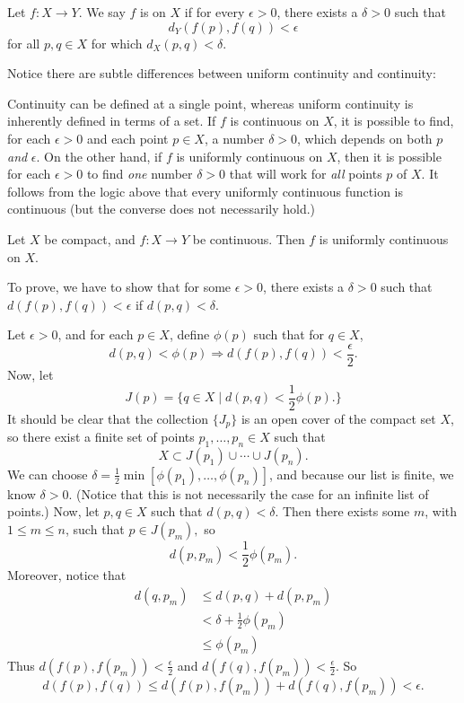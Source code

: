 \documentclass{article}
\begin{document}
\begin{definition}
    Let $f:X\rightarrow Y$. We say $f$ is  on $X$ if for every $\epsilon>0$, there exists a $\delta>0$ such that \[d_{Y}(f(p),f(q))<\epsilon\]for all $p,q\in X$ for which $d_{X}(p,q)<\delta$.
\end{definition}
Notice there are subtle differences between uniform continuity and continuity:
\begin{itemize}
    \ii Continuity can be defined at a single point, whereas uniform continuity is inherently defined in terms of a set.
    \ii If $f$ is continuous on $X$, it is possible to find, for each $\epsilon>0$ and each point $p\in X$, a number $\delta>0$, which depends on both $p$ \textit{and} $\epsilon$. 
    \ii On the other hand, if $f$ is uniformly continuous on $X$, then it is possible for each $\epsilon>0$ to find \textit{one} number $\delta>0$ that will work for \textit{all} points $p$ of $X$.
    \ii It follows from the logic above that every uniformly continuous function is continuous (but the converse does not necessarily hold.)
\end{itemize}
\begin{theorem}
    Let $X$ be compact, and $f:X\rightarrow Y$ be continuous. Then $f$ is uniformly continuous on $X$.
\end{theorem}
\begin{remark}
    To prove, we have to show that for some $\epsilon>0$, there exists a $\delta>0$ such that $d(f(p),f(q))<\epsilon$ if $d(p,q)<\delta$.

    Let $\epsilon>0$, and for each $p\in X$, define $\phi(p)$ such that for $q\in X$, 
    \[d(p,q)<\phi(p)\Rightarrow d(f(p),f(q))<\frac{\epsilon}{2}.\]Now, let \[J(p)=\{q\in X\mid d(p,q)<\frac{1}{2}\phi(p).\}\]
    It should be clear that the collection $\{J_{p}\}$ is an open cover of the compact set $X$, so there exist a finite set of points $p_{1},\dotsc,p_{n}\in X$ such that \[X\subset J(p_{1})\cup\dotsi\cup J(p_{n}).\]We can choose $\delta=\frac{1}{2}\min[\phi(p_{1}),\dotsc,\phi(p_{n})]$, and because our list is finite, we know $\delta>0$. (Notice that this is not necessarily the case for an infinite list of points.) Now, let $p,q\in X$ such that $d(p,q)<\delta$. Then there exists some $m$, with $1\leq m\leq n$, such that $p\in J(p_{m}),$ so \[d(p,p_{m})<\frac{1}{2}\phi(p_{m}).\]Moreover, notice that \begin{align*}
        d(q,p_{m}) & \leq d(p,q)+d(p,p_{m})\\
        & <\delta+\frac{1}{2}\phi(p_{m})\\
        & \leq \phi(p_{m})
    \end{align*}
    Thus $d(f(p),f(p_{m}))<\frac{\epsilon}{2}$ and $d(f(q),f(p_{m}))<\frac{\epsilon}{2}$. So \[d(f(p),f(q))\leq d(f(p),f(p_{m}))+d(f(q),f(p_{m}))<\epsilon.\]
\end{remark}
\end{document}
